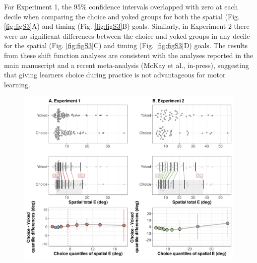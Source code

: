 \documentclass[
  doc, donotrepeattitle,floatsintext]{apa7}
\begin{document}
For Experiment 1, the 95\% confidence intervals overlapped with zero at each decile when comparing the choice and yoked groups for both the spatial (Fig. \ref{fig:figS3}A) and timing (Fig. \ref{fig:figS3}B) goals. Similarly, in Experiment 2 there were no significant differences between the choice and yoked groups in any decile for the spatial (Fig. \ref{fig:figS3}C) and timing (Fig. \ref{fig:figS3}D) goals. The results from these shift function analyses are consistent with the analyses reported in the main manuscript and a recent meta-analysis (McKay et al., in-press), suggesting that giving learners choice during practice is not advantageous for motor learning.

\begin{figure}

{\centering \includegraphics{../../figs/figS3} 

}


\end{figure}
\end{document}
